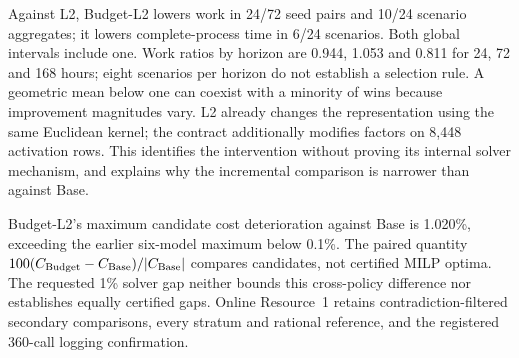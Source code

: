 Against L2, Budget-L2 lowers work in 24/72 seed pairs and 10/24 scenario
aggregates; it lowers complete-process time in 6/24 scenarios. Both global
intervals include one. Work ratios by horizon are 0.944, 1.053 and 0.811 for
24, 72 and 168 hours; eight scenarios per horizon do not establish a selection
rule. A geometric mean below one can coexist with a minority of wins because
improvement magnitudes vary. L2 already changes the representation using the
same Euclidean kernel; the contract additionally modifies factors on 8,448
activation rows. This identifies the intervention without proving its internal
solver mechanism, and explains why the incremental comparison is narrower
than against Base.

Budget-L2's maximum candidate cost deterioration against Base is 1.020\%,
exceeding the earlier six-model maximum below 0.1\%. The paired quantity
$100(C_{\rm Budget}-C_{\rm Base})/|C_{\rm Base}|$ compares candidates, not
certified MILP optima. The requested 1\% solver gap neither bounds this
cross-policy difference nor establishes equally certified gaps. Online
Resource~1 retains contradiction-filtered secondary comparisons, every
stratum and rational reference, and the registered 360-call logging confirmation.
